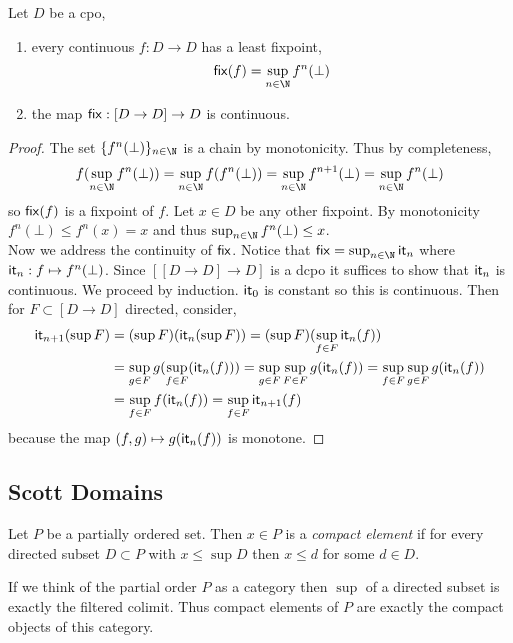 \documentclass[12pt]{article}
\begin{document}
\begin{theorem}[Kleene]
Let $D$ be a cpo,
\begin{enumerate}
\item every continuous $f : D \to D$ has a least fixpoint,
\[ \fix(f) = \sup_{n \in \N} f^n(\bot) \]
\item the map $\fix : [D \to D] \to D$ is continuous. 
\end{enumerate}
\end{theorem}

\begin{proof}
The set $\{ f^n(\bot) \}_{n \in \N}$ is a chain by monotonicity. Thus by completeness,
\[ f(\sup_{n \in \N} f^n(\bot)) = \sup_{n \in \N} f(f^n(\bot)) = \sup_{n \in \N} f^{n+1}(\bot) = \sup_{n \in \N} f^n(\bot) \]
so $\fix(f)$ is a fixpoint of $f$. Let $x \in D$ be any other fixpoint. By monotonicity $f^n(\bot) \le f^n(x) = x$ and thus $\sup_{n \in \N} f^n(\bot) \le x$.
\bigskip\\
Now we address the continuity of $\fix$. Notice that $\fix = \sup_{n \in \N} \it_n$ where $\it_n : f \mapsto f^n(\bot)$. Since $[[D \to D] \to D]$ is a dcpo it suffices to show that $\it_n$ is continuous. We proceed by induction. $\it_0$ is constant so this is continuous. Then for $F \subset [D \to D]$ directed, consider,
\begin{align*}
\it_{n+1}(\sup F) & = (\sup F)(\it_n(\sup F)) = (\sup F)(\sup_{f \in F} \it_n(f)) 
\\
& = \sup_{g \in F} g (\sup_{f \in F}(\it_n(f))) = \sup_{g \in F} \sup_{F \in F} g(\it_n(f)) = \sup_{f \in F} \sup_{g \in F} g(\it_n(f))
\\
& = \sup_{f \in F} f(\it_n(f)) = \sup_{f \in F} \it_{n+1}(f)
\end{align*}
because the map $(f, g) \mapsto g(\it_n(f))$ is monotone. 
\end{proof}

\subsection{Scott Domains}

\begin{defn}
Let $P$ be a partially ordered set. Then $x \in P$ is a \textit{compact element} if for every directed subset $D \subset P$ with $x \le \sup{D}$ then $x \le d$ for some $d \in D$.
\end{defn}

\begin{rmk}
If we think of the partial order $P$ as a category then $\sup$ of a directed subset is exactly the filtered colimit. Thus compact elements of $P$ are exactly the compact objects of this category.
\end{rmk}
\end{document}

